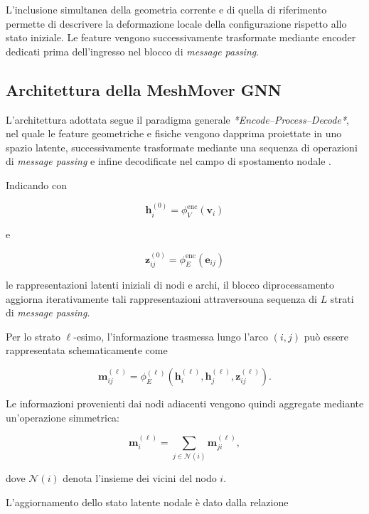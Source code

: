 L'inclusione simultanea della geometria corrente e di quella di riferimento permette di descrivere la deformazione locale della configurazione rispetto allo stato iniziale. Le feature vengono successivamente trasformate mediante encoder dedicati prima dell'ingresso nel blocco di \textit{message passing}.

\subsection{Architettura della MeshMover GNN}
\label{subsec:gnn_arch}

L'architettura adottata segue il paradigma generale \textit{*Encode--Process--Decode*}, nel quale le feature geometriche e fisiche vengono dapprima proiettate in uno spazio latente, successivamente trasformate mediante una sequenza di operazioni di \textit{message passing} e infine decodificate nel campo di spostamento nodale \citep{battaglia2018relational}.

Indicando con

\[
\mathbf{h}_i^{(0)}
=
\phi_V^{\mathrm{enc}}(\mathbf{v}_i)
\]

e

\[
\mathbf{z}_{ij}^{(0)}
=
\phi_E^{\mathrm{enc}}(\mathbf{e}_{ij})
\]

le rappresentazioni latenti iniziali di nodi e archi, il blocco diprocessamento aggiorna iterativamente tali rappresentazioni attraversouna sequenza di $L$ strati di \textit{message passing}.

Per lo strato $\ell$-esimo, l'informazione trasmessa lungo l'arco $(i,j)$ può essere rappresentata schematicamente come

\begin{equation}
\mathbf{m}_{ij}^{(\ell)}
=
\phi_E^{(\ell)}
\left(
\mathbf{h}_i^{(\ell)},
\mathbf{h}_j^{(\ell)},
\mathbf{z}_{ij}^{(\ell)}
\right).
\label{eq:message_function}
\end{equation}

Le informazioni provenienti dai nodi adiacenti vengono quindi aggregate mediante un'operazione simmetrica:

\begin{equation}
\mathbf{m}_i^{(\ell)}
=
\sum_{j\in\mathcal{N}(i)}
\mathbf{m}_{ji}^{(\ell)},
\label{eq:message_aggregation}
\end{equation}

dove $\mathcal{N}(i)$ denota l'insieme dei vicini del nodo $i$.

L'aggiornamento dello stato latente nodale è dato dalla relazione

